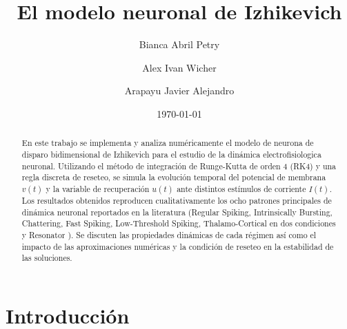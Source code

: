 \documentclass[aps,prl,twocolumn,superscriptaddress]{revtex4-2}
\begin{document}
\title{
El modelo neuronal de Izhikevich
}

\author{Bianca Abril Petry}

\author{Alex Ivan Wicher}

\author{Arapayu Javier Alejandro}


\date{\today}

\begin{abstract}
En este trabajo se implementa y analiza numéricamente el modelo de neurona de disparo bidimensional de Izhikevich para el estudio de la dinámica electrofisiologica neuronal. Utilizando el método de integración de Runge-Kutta de orden 4 (RK4) y una regla discreta de reseteo, se simula la evolución temporal del potencial de membrana $v{(t)}$ y la variable de recuperación $u{(t)}$ ante distintos estímulos de corriente $I{(t)}$. Los resultados obtenidos reproducen cualitativamente los ocho patrones principales de dinámica neuronal reportados en la literatura ({Regular Spiking, Intrinsically Bursting, Chattering, Fast Spiking, Low-Threshold Spiking, Thalamo-Cortical} en dos condiciones y Resonator ). Se discuten las propiedades dinámicas de cada régimen así como el impacto de las aproximaciones numéricas y la condición de reseteo en la estabilidad de las soluciones.


\end{abstract}

\maketitle

\section{Introducción}
\end{document}
